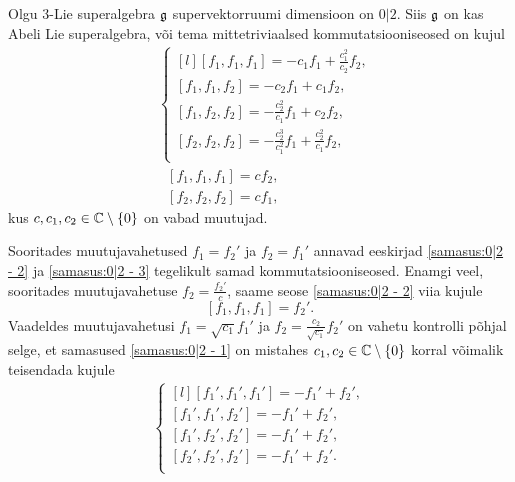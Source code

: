 \begin{lau} \label{lause:0|2 seosed}
    Olgu $3$-Lie superalgebra $\mathfrak{g}$ supervektorruumi dimensioon on $0|2$.
    Siis $\mathfrak{g}$ on kas Abeli Lie superalgebra, või tema mittetriviaalsed
    kommutatsiooniseosed on kujul
    \renewcommand\arraystretch{1.5}
    \begin{align}
        & \left\{
            \begin{matrix*}[l]
                [f_1, f_1, f_1] = -c_1 f_1 + \frac{c_1^2}{c_2} f_2, \\
                [f_1, f_1, f_2] = -c_2 f_1 + c_1 f_2, \\
                [f_1, f_2, f_2] = -\frac{c_2^2}{c_1} f_1 + c_2 f_2, \\
                [f_2, f_2, f_2] = -\frac{c_2^3}{c_1^2} f_1 +
                    \frac{c_2^2}{c_1} f_2, \\
            \end{matrix*}
        \right. \label{samasus:0|2 - 1} \\[0.2cm]
        &\ \ \ [f_1, f_1, f_1] = c f_2, \label{samasus:0|2 - 2} \\[0.2cm]
        &\ \ \ [f_2, f_2, f_2] = c f_1, \label{samasus:0|2 - 3}
    \end{align}
    \renewcommand\arraystretch{1}
    kus $c, c_1, c_2 \in \mathbb{C} \setminus \{ 0 \}$ on vabad muutujad.
\end{lau}

Sooritades muutujavahetused $f_1 = f_2'$ ja $f_2 = f_1'$ annavad
eeskirjad \eqref{samasus:0|2 - 2} ja \eqref{samasus:0|2 - 3}
tegelikult samad kommutatsiooniseosed. Enamgi veel, sooritades muutujavahetuse
$f_2 = \frac{f_2'}{c}$, saame seose \eqref{samasus:0|2 - 2} viia kujule
\[ [f_1, f_1, f_1] = f_2'. \]
Vaadeldes muutujavahetusi $f_1 = \sqrt{c_1} f_1'$ ja
$f_2 = \frac{c_2}{\sqrt{c_1}} f_2'$ on vahetu kontrolli põhjal selge, et
samasused \eqref{samasus:0|2 - 1} on mistahes $c_1, c_2 \in \mathbb{C} \setminus \{0\}$
korral võimalik teisendada kujule
\begin{align*}
    \left\{
        \begin{matrix*}[l]
            [f_1', f_1', f_1'] = -f_1' + f_2', \\
            [f_1', f_1', f_2'] = -f_1' + f_2', \\
            [f_1', f_2', f_2'] = -f_1' + f_2', \\
            [f_2', f_2', f_2'] = -f_1' + f_2'. \\
        \end{matrix*}
    \right.
\end{align*}

